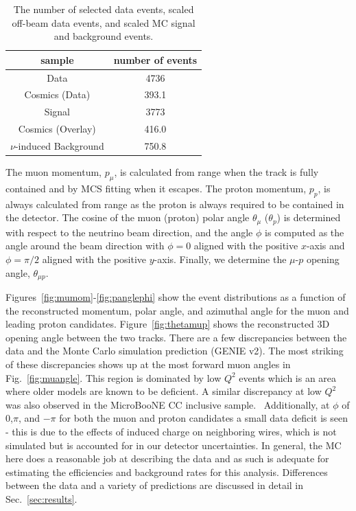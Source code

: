 \documentclass[%
twocolumn,
 amsmath,amssymb,
 aps,
prd,
superscriptaddress,showpacs]{revtex4-2}
\begin{document}
\begin{table}[ht]
    \centering
    \begin{tabular}{|c|c|} \hline
         sample & number of events \\ \hline
         Data & 4736 \\
         Cosmics (Data) & 393.1 \\
         Signal & 3773 \\
         Cosmics (Overlay)  & 416.0  \\
         $\nu$-induced Background & 750.8 \\ \hline
    \end{tabular}
    \caption{The number of selected data events, scaled off-beam data events, and scaled MC signal and background events.}
    \label{tab:eventRates}
\end{table}


The muon momentum, $p_\mu$, is calculated from range when the track is fully contained and by MCS fitting when it escapes.  
The proton momentum, $p_p$, is always calculated from range as the proton is always required to be contained in the \mub  detector.
The cosine of the muon (proton) polar angle $\theta_\mu$ ($\theta_p$) is determined with respect to the neutrino beam direction, and the angle $\phi$ is computed as the angle around the beam direction with $\phi=0$ aligned with the positive $x$-axis and $\phi=\pi/2$ aligned with the positive $y$-axis.
Finally, we determine the $\mu$-$p$ opening angle, $\theta_{\mu p}$.

Figures~\ref{fig:mumom}-\ref{fig:panglephi} show the event distributions as a function of the reconstructed momentum, polar angle, and azimuthal angle for the muon and leading proton candidates. 
Figure~\ref{fig:thetamup} shows the reconstructed 3D opening angle between the two tracks.
There are a few discrepancies between the data and the Monte Carlo simulation prediction (GENIE v2). 
The most striking of these discrepancies shows up at the most forward muon angles in Fig.~\ref{fig:muangle}.
This region is dominated by low $Q^2$ events which is an area where older models are known to be deficient.
A similar discrepancy at low $Q^2$ was also observed in the MicroBooNE CC inclusive sample.~\cite{Adams:2019iqcINCL}
Additionally, at $\phi$ of 0,$\pi$, and $-\pi$ for both the muon and proton candidates a small data deficit is seen - this is due to the effects of induced charge on neighboring wires, which is not simulated but is accounted for in our detector uncertainties.
In general, the MC here does a reasonable job at describing the data and as such is adequate for estimating the efficiencies and background rates for this analysis.
Differences between the data and a variety of predictions are discussed in detail in Sec.~\ref{sec:results}.
\end{document}

